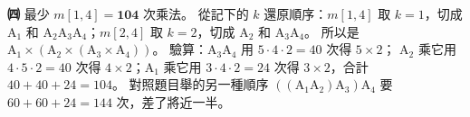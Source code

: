 \begin{pastsoln}
\textbf{㈣} 最少 $m[1, 4] = \mathbf{104}$ 次乘法。 從記下的 $k$ 還原順序：$m[1, 4]$ 取 $k = 1$，切成
$\mathrm{A}_1$ 和 $\mathrm{A}_2\mathrm{A}_3\mathrm{A}_4$；$m[2, 4]$ 取 $k = 2$，切成 $\mathrm{A}_2$ 和
$\mathrm{A}_3\mathrm{A}_4$。 所以是 $\mathrm{A}_1 \times (\mathrm{A}_2 \times (\mathrm{A}_3 \times
\mathrm{A}_4))$。 驗算：$\mathrm{A}_3\mathrm{A}_4$ 用 $5 \cdot 4 \cdot 2 = 40$ 次得 $5 \times 2$；
$\mathrm{A}_2$ 乘它用 $4 \cdot 5 \cdot 2 = 40$ 次得 $4 \times 2$；$\mathrm{A}_1$ 乘它用
$3 \cdot 4 \cdot 2 = 24$ 次得 $3 \times 2$，合計 $40 + 40 + 24 = 104$。 對照題目舉的另一種順序
$((\mathrm{A}_1\mathrm{A}_2)\mathrm{A}_3)\mathrm{A}_4$ 要 $60 + 60 + 24 = 144$ 次，差了將近一半。
\end{pastsoln}
